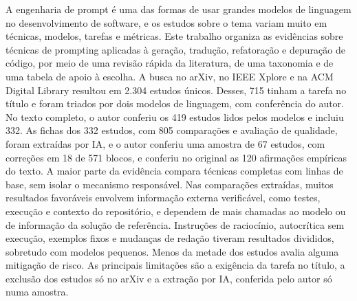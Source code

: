 A engenharia de prompt é uma das formas de usar grandes modelos de linguagem no desenvolvimento de software, e os
estudos sobre o tema variam muito em técnicas, modelos, tarefas e métricas. Este trabalho organiza as evidências sobre
técnicas de prompting aplicadas à geração, tradução, refatoração e depuração de código, por meio de uma revisão
rápida da literatura, de uma taxonomia e de uma tabela de apoio à escolha. A busca no arXiv, no IEEE Xplore e na ACM
Digital Library resultou em 2.304 estudos únicos. Desses, 715 tinham a tarefa no título e foram triados por dois
modelos de linguagem, com conferência do autor. No texto completo, o autor conferiu os 419 estudos lidos pelos modelos e incluiu 332. As fichas dos 332 estudos, com 805 comparações e avaliação de qualidade, foram extraídas por IA, e o autor conferiu
uma amostra de 67 estudos, com correções em 18 de 571 blocos, e conferiu no original as 120 afirmações
empíricas do texto. A maior parte da evidência compara técnicas completas com linhas de base,
sem isolar o mecanismo responsável. Nas comparações extraídas, muitos resultados favoráveis envolvem informação externa
verificável, como testes, execução e contexto do repositório, e dependem de mais chamadas ao modelo ou de informação
da solução de referência. Instruções de raciocínio, autocrítica sem execução, exemplos fixos e mudanças de redação
tiveram resultados divididos, sobretudo com modelos pequenos. Menos da metade dos estudos avalia alguma mitigação de
risco. As principais limitações são a exigência da tarefa no título, a exclusão dos estudos só no arXiv e a extração por IA,
conferida pelo autor só numa amostra.
